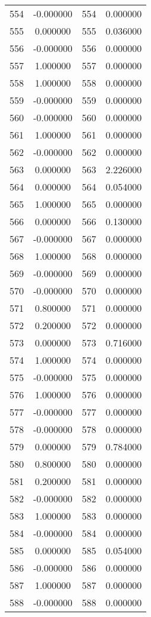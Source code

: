 \documentclass[12pt]{article}
\begin{document}
\begin{longtable}{@{}cccc@{}}
554 & -0.000000 & 554 & 0.000000 \\
555 & 0.000000 & 555 & 0.036000 \\
556 & -0.000000 & 556 & 0.000000 \\
557 & 1.000000 & 557 & 0.000000 \\
558 & 1.000000 & 558 & 0.000000 \\
559 & -0.000000 & 559 & 0.000000 \\
560 & -0.000000 & 560 & 0.000000 \\
561 & 1.000000 & 561 & 0.000000 \\
562 & -0.000000 & 562 & 0.000000 \\
563 & 0.000000 & 563 & 2.226000 \\
564 & 0.000000 & 564 & 0.054000 \\
565 & 1.000000 & 565 & 0.000000 \\
566 & 0.000000 & 566 & 0.130000 \\
567 & -0.000000 & 567 & 0.000000 \\
568 & 1.000000 & 568 & 0.000000 \\
569 & -0.000000 & 569 & 0.000000 \\
570 & -0.000000 & 570 & 0.000000 \\
571 & 0.800000 & 571 & 0.000000 \\
572 & 0.200000 & 572 & 0.000000 \\
573 & 0.000000 & 573 & 0.716000 \\
574 & 1.000000 & 574 & 0.000000 \\
575 & -0.000000 & 575 & 0.000000 \\
576 & 1.000000 & 576 & 0.000000 \\
577 & -0.000000 & 577 & 0.000000 \\
578 & -0.000000 & 578 & 0.000000 \\
579 & 0.000000 & 579 & 0.784000 \\
580 & 0.800000 & 580 & 0.000000 \\
581 & 0.200000 & 581 & 0.000000 \\
582 & -0.000000 & 582 & 0.000000 \\
583 & 1.000000 & 583 & 0.000000 \\
584 & -0.000000 & 584 & 0.000000 \\
585 & 0.000000 & 585 & 0.054000 \\
586 & -0.000000 & 586 & 0.000000 \\
587 & 1.000000 & 587 & 0.000000 \\
588 & -0.000000 & 588 & 0.000000 \\

\end{longtable}
\end{document}
